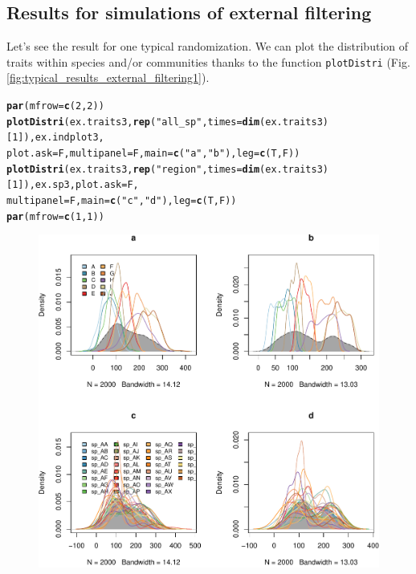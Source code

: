 \documentclass[12pt]{article}\usepackage[]{graphicx}\usepackage[]{color}
\makeatletter
\def\maxwidth{ %
  \ifdim\Gin@nat@width>\linewidth
    \linewidth
  \else
    \Gin@nat@width
  \fi
}
\newcommand{\hlnum}[1]{\textcolor[rgb]{0.686,0.059,0.569}{#1}}%
\newcommand{\hlstr}[1]{\textcolor[rgb]{0.192,0.494,0.8}{#1}}%
\newcommand{\hlstd}[1]{\textcolor[rgb]{0.345,0.345,0.345}{#1}}%
\newcommand{\hlkwc}[1]{\textcolor[rgb]{0.333,0.667,0.333}{#1}}%
\newcommand{\hlkwd}[1]{\textcolor[rgb]{0.737,0.353,0.396}{\textbf{#1}}}%
\newenvironment{kframe}{%
 \def\at@end@of@kframe{}%
 \ifinner\ifhmode%
  \def\at@end@of@kframe{\end{minipage}}%
  \begin{minipage}{\columnwidth}%
 \fi\fi%
 \def\FrameCommand##1{\hskip\@totalleftmargin \hskip-\fboxsep
 \colorbox{shadecolor}{##1}\hskip-\fboxsep
     \hskip-\linewidth \hskip-\@totalleftmargin \hskip\columnwidth}%
 \MakeFramed {\advance\hsize-\width
   \@totalleftmargin\z@ \linewidth\hsize
   \@setminipage}}%
 {\par\unskip\endMakeFramed%
 \at@end@of@kframe}
\newenvironment{knitrout}{}{} %
\makeatother
\begin{document}
 \subsection {Results for simulations of external filtering}

Let's see the result for one typical randomization. We can plot the distribution of traits within species and/or communities thanks to the function \texttt{plotDistri} (Fig. \ref{fig:typical_results_external_filtering1}). 

\begin{knitrout}\small
{}\color{fgcolor}\begin{kframe}
\begin{alltt}
\hlkwd{par}\hlstd{(}\hlkwc{mfrow}\hlstd{=}\hlkwd{c}\hlstd{(}\hlnum{2}\hlstd{,} \hlnum{2}\hlstd{))}
\hlkwd{plotDistri}\hlstd{(ex.traits3,} \hlkwd{rep}\hlstd{(}\hlstr{"all_sp"}\hlstd{,} \hlkwc{times} \hlstd{=} \hlkwd{dim}\hlstd{(ex.traits3)[}\hlnum{1}\hlstd{]), ex.indplot3,}
           \hlkwc{plot.ask} \hlstd{= F,} \hlkwc{multipanel} \hlstd{= F,} \hlkwc{main} \hlstd{=} \hlkwd{c}\hlstd{(}\hlstr{"a"}\hlstd{,} \hlstr{"b"}\hlstd{),} \hlkwc{leg} \hlstd{=} \hlkwd{c}\hlstd{(T, F))}
\hlkwd{plotDistri}\hlstd{(ex.traits3,} \hlkwd{rep}\hlstd{(}\hlstr{"region"}\hlstd{,} \hlkwc{times} \hlstd{=} \hlkwd{dim}\hlstd{(ex.traits3)[}\hlnum{1}\hlstd{]), ex.sp3,} \hlkwc{plot.ask} \hlstd{= F,}
           \hlkwc{multipanel} \hlstd{= F,} \hlkwc{main} \hlstd{=} \hlkwd{c}\hlstd{(}\hlstr{"c"}\hlstd{,} \hlstr{"d"}\hlstd{),} \hlkwc{leg} \hlstd{=} \hlkwd{c}\hlstd{(T, F))}
\hlkwd{par}\hlstd{(}\hlkwc{mfrow}\hlstd{=}\hlkwd{c}\hlstd{(}\hlnum{1}\hlstd{,} \hlnum{1}\hlstd{))}
\end{alltt}
\end{kframe}\begin{figure}

{\centering \includegraphics[width=\maxwidth]{figure/typical_results_external_filtering1-1} 

}
\end{figure}
\end{knitrout}
\end{document}
